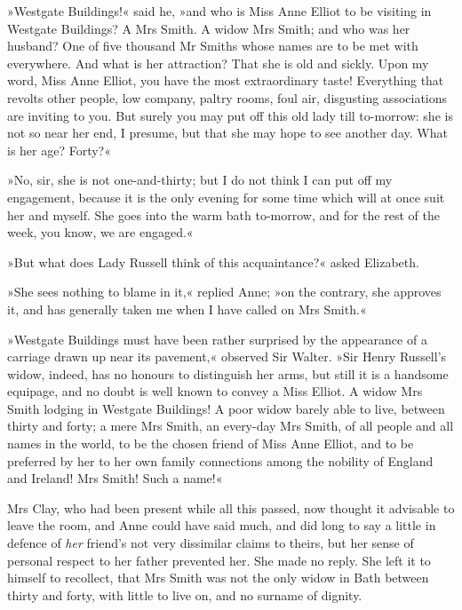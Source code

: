 »Westgate Buildings!« said he, »and who is Miss Anne Elliot to be visiting in Westgate Buildings? A Mrs Smith. A widow Mrs Smith; and who was her husband? One of five thousand Mr Smiths whose names are to be met with everywhere. And what is her attraction? That she is old and sickly. Upon my word, Miss Anne Elliot, you have the most extraordinary taste! Everything that revolts other people, low company, paltry rooms, foul air, disgusting associations are inviting to you. But surely you may put off this old lady till to-morrow: she is not so near her end, I presume, but that she may hope to see another day. What is her age? Forty?«

»No, sir, she is not one-and-thirty; but I do not think I can put off my engagement, because it is the only evening for some time which will at once suit her and myself. She goes into the warm bath to-morrow, and for the rest of the week, you know, we are engaged.«

»But what does Lady Russell think of this acquaintance?« asked Elizabeth.

»She sees nothing to blame in it,« replied Anne; »on the contrary, she approves it, and has generally taken me when I have called on Mrs Smith.«

»Westgate Buildings must have been rather surprised by the appearance of a carriage drawn up near its pavement,« observed Sir Walter. »Sir Henry Russell's widow, indeed, has no honours to distinguish her arms, but still it is a handsome equipage, and no doubt is well known to convey a Miss Elliot. A widow Mrs Smith lodging in Westgate Buildings! A poor widow barely able to live, between thirty and forty; a mere Mrs Smith, an every-day Mrs Smith, of all people and all names in the world, to be the chosen friend of Miss Anne Elliot, and to be preferred by her to her own family connections among the nobility of England and Ireland! Mrs Smith! Such a name!«

Mrs Clay, who had been present while all this passed, now thought it advisable to leave the room, and Anne could have said much, and did long to say a little in defence of \textit{her} friend's not very dissimilar claims to theirs, but her sense of personal respect to her father prevented her. She made no reply. She left it to himself to recollect, that Mrs Smith was not the only widow in Bath between thirty and forty, with little to live on, and no surname of dignity.

